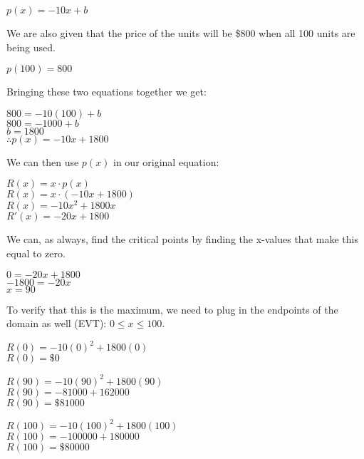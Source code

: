 \documentclass[12pt,fleqn]{book} %
\begin{document}
\begin{center}
    $p(x) = -10x + b$
\end{center}

\noindent We are also given that the price of the units will be \$800 when all 100 units are being used.

\begin{center}
    $p(100)=800$
\end{center}

\noindent Bringing these two equations together we get:

\begin{center}
    $800=-10(100)+b$ \\
    $800=-1000+b$ \\
    $b=1800$ \\
    $\therefore p(x)=-10x+1800$
\end{center}

\noindent We can then use $p(x)$ in our original equation:

\begin{center}
    $R(x) = x \cdot p(x)$ \\
    $R(x)=x \cdot (-10x+1800)$ \\
    $R(x)=-10x^2+1800x$ \\
    $R'(x)=-20x+1800$
\end{center}

\noindent We can, as always, find the critical points by finding the x-values that make this equal to zero.

\begin{center}
    $0 =-20x+1800$ \\
    $-1800=-20x$ \\
    $x=90$ \\
\end{center}

\noindent To verify that this is the maximum, we need to plug in the endpoints of the domain as well (EVT): $0\leq x \leq 100$.

\begin{multicols}{3}
    \begin{center}
        $R(0)=-10(0)^2+1800(0)$ \\
        $R(0)=\$0$
        \columnbreak

        $R(90)=-10(90)^2+1800(90)$ \\
        $R(90)=-81000+162000$ \\
        $R(90)=\$81000$
        \columnbreak

        $R(100)=-10(100)^2+1800(100)$ \\
        $R(100)=-100000+180000$ \\
        $R(100)=\$80000$
    \end{center}
\end{multicols}
\end{document}
